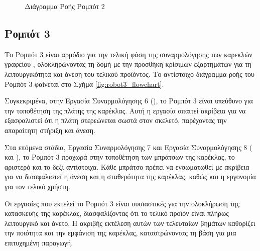 \begin{figure}[H]
    \centering
    \caption{Διάγραμμα Ροής Ρομπότ 2}
    \label{fig:robot2_flowchart}
\end{figure}

\subsection{Ρομπότ 3}
\noindent Το Ρομπότ 3 είναι αρμόδιο για την τελική φάση της συναρμολόγησης των καρεκλών γραφείου , ολοκληρώνοντας τη δομή με την προσθήκη κρίσιμων εξαρτημάτων για τη λειτουργικότητα και άνεση του τελικού προϊόντος. Το αντίστοιχο διάγραμμα ροής του Ρομπότ 3 φαίνεται στο Σχήμα \ref{fig:robot3_flowchart}.

Συγκεκριμένα, στην Εργασία Συναρμολόγησης 6 (), το Ρομπότ 3 είναι υπεύθυνο για την τοποθέτηση της πλάτης της καρέκλας. Αυτή η εργασία απαιτεί ακρίβεια για να εξασφαλιστεί ότι η πλάτη στερεώνεται σωστά στον σκελετό, παρέχοντας την απαραίτητη στήριξη και άνεση.

Στα επόμενα στάδια, Εργασία Συναρμολόγησης 7 και Εργασία Συναρμολόγησης 8 ( και ), το Ρομπότ 3 προχωρά στην τοποθέτηση των μπράτσων της καρέκλας, το αριστερό και το δεξί αντίστοιχα. Κάθε μπράτσο πρέπει να ενσωματωθεί με ακρίβεια για να διασφαλιστεί η άνεση και η σταθερότητα της καρέκλας, καθώς και η εργονομία για τον τελικό χρήστη.

Οι εργασίες που εκτελεί το Ρομπότ 3 είναι ουσιαστικές για την ολοκλήρωση της κατασκευής της καρέκλας, διασφαλίζοντας ότι το τελικό προϊόν είναι πλήρως λειτουργικό και άνετο. Η ακριβής εκτέλεση αυτών των τελευταίων βημάτων καθορίζει την ποιότητα και την εμφάνιση της καρέκλας, καταστρώνοντας τη βάση για μια επιτυχημένη παραγωγή.

